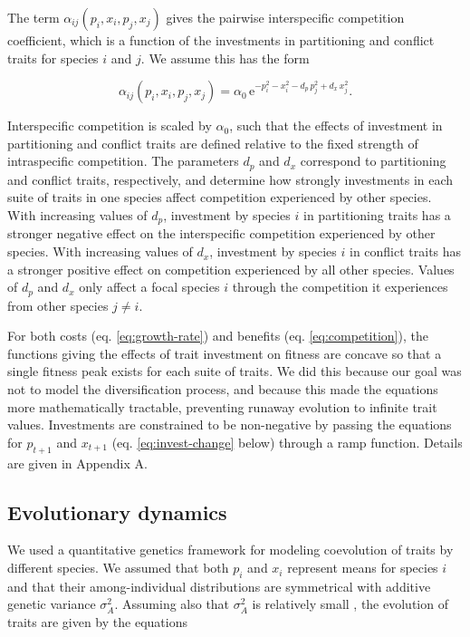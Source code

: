 The term $\alpha_{ij}( p_{i},x_{i},p_{j},x_{j} )$ gives the
pairwise interspecific competition coefficient, which is a function of
the investments in partitioning and conflict traits for species $i$
and $j$. We assume this has the form

\begin{equation} \label{eq:competition}
    \alpha_{ij}(p_i, x_i, p_j, x_j) = \alpha_0 \,
        \text{e}^{-p_i^2 - x_i^2 - d_p \, p_j^2 + d_x \, x_j^2 }
	\textrm{.}
\end{equation}


\noindent Interspecific competition is scaled by $\alpha_{0}$, such that the
effects of investment in partitioning and conflict traits are defined
relative to the fixed strength of intraspecific competition. The
parameters $d_{p}$ and $d_{x}$ correspond to partitioning and
conflict traits, respectively, and determine how strongly investments in
each suite of traits in one species affect competition experienced by
other species. With increasing values of $d_{p}$, investment by
species $i$ in partitioning traits has a stronger negative effect on
the interspecific competition experienced by other species. With
increasing values of $d_{x}$, investment by species $i$ in conflict
traits has a stronger positive effect on competition experienced by all
other species. Values of $d_{p}$ and $d_{x}$ only affect a focal
species $i$ through the competition it experiences from other species
$j \neq i$.

For both costs (eq. \ref{eq:growth-rate}) and 
benefits (eq. \ref{eq:competition}), the functions giving the
effects of trait investment on fitness are concave so that a single
fitness peak exists for each suite of traits. We did this because our
goal was not to model the diversification process, and because this made
the equations more mathematically tractable, preventing runaway
evolution to infinite trait values. Investments are constrained to be
non-negative by passing the equations for $p_{t + 1}$ and
$x_{t + 1}$ (eq. \ref{eq:invest-change} below) through a ramp function. 
Details are given in Appendix A.

\subsection*{Evolutionary dynamics}

We used a quantitative genetics framework for modeling coevolution of
traits by different species. We assumed that both $p_{i}$ and
$x_{i}$ represent means for species $i$ and that their
among-individual distributions are symmetrical with additive genetic
variance $\sigma_{A}^{2}$. Assuming also that $\sigma_{A}^{2}$ is
relatively small \citep{Abrams1993b, Abrams2001a, Iwasa1991a},
the evolution of traits are given by the equations



